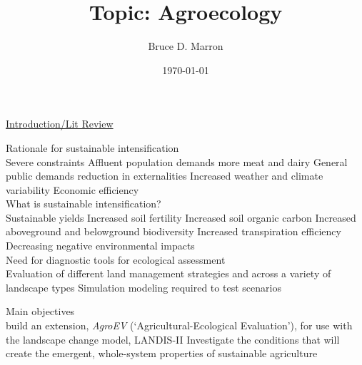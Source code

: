 \documentclass[12pt, letterpaper]{article}
\title{\vspace{-15mm}\fontsize{14pt}{10pt}
                    \selectfont \textbf{Topic: Agroecology}   %
                    \vspace{-7mm}
      }
\author{
     \normalsize Bruce D. Marron \\                     %
}
\date{\normalsize \today}
\begin{document}
\begin{singlespacing}
\maketitle                                      %
\end{singlespacing}
\thispagestyle{fancy}                           %

\underline{Introduction/Lit Review}
\begin{outline}[enumerate]
\1 Rationale for sustainable intensification\\
\cite{godfray_food_2010, parry_effects_2004, zhao_drought-induced_2010, barnosky_approaching_2012, schmidhuber_global_2007, eigenbrod_impact_2011, dodds_human_2013, rogers_facing_2008, lobell_climate_2011, wada_global_2010, tilman_forecasting_2001}
\2 Severe constraints
\3 Affluent population demands more meat and dairy
\3 General public demands reduction in externalities
\3 Increased weather and climate variability
\3 Economic efficiency\\

\1 What is sustainable intensification?\\
\cite{altieri_agroecology_2015, nicholls_plant_2013, gliessman_agroecology:_2015, baulcombe_reaping_2009}
\2 Sustainable yields
\2 Increased soil fertility
\2 Increased soil organic carbon
\2 Increased aboveground and belowground biodiversity
\2 Increased transpiration efficiency
\2 Decreasing negative environmental impacts\\

\1 Need for diagnostic tools for ecological assessment\\
\cite{rygiewicz_soil_2010, compant_stephane_plant_2010, prosser_role_2007, scheller_design_2007}
\2 Evaluation of different land management strategies and across a variety of landscape types
\2 Simulation modeling required to test scenarios

\1 Main objectives\\
\cite{scheller_design_2007, gliessman_agroecology:_2015}
\2 build an extension, \textit{AgroEV} (\enquote*{Agricultural-Ecological Evaluation}), for use with the landscape change model, LANDIS-II
\2 Investigate the conditions that will create the emergent, whole-system properties of sustainable agriculture
\end{outline}






\clearpage 
\renewcommand{\thepage}{}
\printbibliography
\end{document}
